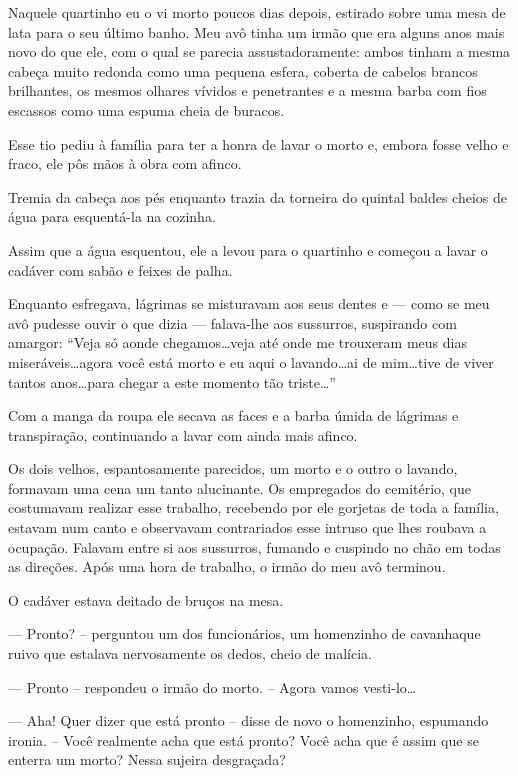 Naquele quartinho eu o vi morto poucos dias depois, estirado sobre uma mesa de lata para o seu último banho. Meu avô tinha um irmão que era alguns anos mais novo do que ele, com o qual se parecia assustadoramente: ambos tinham a mesma cabeça muito redonda como uma pequena esfera, coberta de cabelos brancos brilhantes, os mesmos olhares vívidos e penetrantes e a mesma barba com fios escassos como uma espuma cheia de buracos.

Esse tio pediu à família para ter a honra de lavar o morto e, embora fosse velho e fraco, ele pôs mãos à obra com afinco.

Tremia da cabeça aos pés enquanto trazia da torneira do quintal baldes cheios de água para esquentá-la na cozinha.

Assim que a água esquentou, ele a levou para o quartinho e começou a lavar o cadáver com sabão e feixes de palha.

Enquanto esfregava, lágrimas se misturavam aos seus dentes e --- como se meu avô pudesse ouvir o que dizia --- falava-lhe aos sussurros, suspirando com amargor: ``Veja só aonde chegamos\dots veja até onde me trouxeram meus dias miseráveis\dots agora você está morto e eu aqui o lavando\dots ai de mim\dots tive de viver tantos anos\dots para chegar a este momento tão triste\dots''

Com a manga da roupa ele secava as faces e a barba úmida de lágrimas e transpiração, continuando a lavar com ainda mais afinco.

Os dois velhos, espantosamente parecidos, um morto e o outro o lavando, formavam uma cena um tanto alucinante. Os empregados do cemitério, que costumavam realizar esse trabalho, recebendo por ele gorjetas de toda a família, estavam num canto e observavam contrariados esse intruso que lhes roubava a ocupação. Falavam entre si aos sussurros, fumando e cuspindo no chão em todas as direções. Após uma hora de trabalho, o irmão do meu avô terminou.

O cadáver estava deitado de bruços na mesa.

--- Pronto? -- perguntou um dos funcionários, um homenzinho de cavanhaque ruivo que estalava nervosamente os dedos, cheio de malícia.

--- Pronto -- respondeu o irmão do morto. -- Agora vamos vesti-lo\dots

--- Aha! Quer dizer que está pronto -- disse de novo o homenzinho, espumando ironia. -- Você realmente acha que está pronto? Você acha que é assim que se enterra um morto? Nessa 
sujeira desgraçada?

